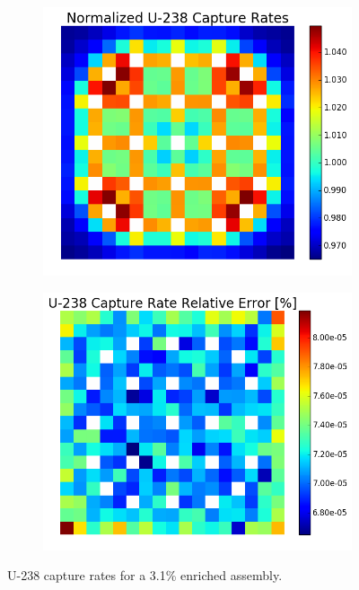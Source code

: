 \begin{figure}[h!]
\centering
\begin{subfigure}{0.44\textwidth}
  \centering
  \includegraphics[width=\linewidth]{figures/benchmarks/capture-rates/capt-mean-fuel-31}
  \caption{}
  \label{fig:chap7-capt-rate-mean-3.1-assm}
\end{subfigure}%
\begin{subfigure}{0.44\textwidth}
  \centering
  \includegraphics[width=\linewidth]{figures/benchmarks/capture-rates/capt-rel-err-fuel-31}
  \caption{}
  \label{fig:chap7-capt-rate-rel-err-3.1-assm}
\end{subfigure}%
\caption[U-238 capture rates for a 3.1\% enriched assembly]{U-238 capture rates for a 3.1\% enriched assembly.}
\label{fig:chap7-capt-rates-3.1-assm}
\end{figure}


